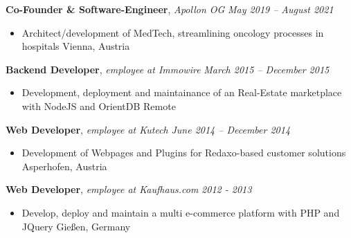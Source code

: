 \documentclass[9pt]{extarticle}
\begin{document}
\noindent
{\bf Co-Founder \& Software-Engineer}, \textit{Apollon OG}  \hfill \textit{May 2019 -- August 2021}
\begin{itemize}
\setlength\itemsep{0.05em}
\item Architect/development of MedTech, streamlining oncology processes in hospitals \hfill Vienna, Austria
\end{itemize}

\noindent
{\bf Backend Developer}, \textit{employee at Immowire}  \hfill \textit{March 2015 -- December 2015}
\begin{itemize}
\setlength\itemsep{0.05em}
\item Development, deployment and maintainance of an Real-Estate marketplace with NodeJS and OrientDB \hfill Remote
\end{itemize}

\noindent
{\bf Web Developer}, \textit{employee at Kutech}  \hfill \textit{June 2014 -- December 2014}
\begin{itemize}
\setlength\itemsep{0.05em}
\item Development of Webpages and Plugins for Redaxo-based customer solutions \hfill Asperhofen, Austria
\end{itemize}

\noindent
{\bf Web Developer}, \textit{employee at Kaufhaus.com}  \hfill \textit{2012 - 2013}
\begin{itemize}
\setlength\itemsep{0.05em}
\item Develop, deploy and maintain a multi e-commerce platform with PHP and JQuery \hfill Gießen, Germany
\end{itemize}
\end{document}
